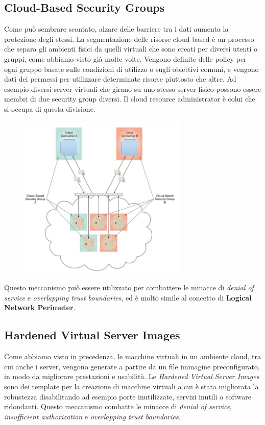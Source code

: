\subsection{Cloud-Based Security Groups}
Come può sembrare scontato, alzare delle barriere tra i dati aumenta la protezione degli stessi. La segmentazione delle risorse cloud-based è un processo che separa gli ambienti fisici da quelli virtuali che sono creati per diversi utenti o gruppi, come abbiamo visto già molte volte. Vengono definite delle policy per ogni gruppo basate sulle condizioni di utilizzo o sugli obiettivi comuni, e vengono dati dei permessi per utilizzare determinate risorse piuttosto che altre. Ad esempio diversi server virtuali che girano su uno stesso server fisico possono essere membri di due security group diversi. Il cloud resource administrator è colui che si occupa di questa divisione.

\begin{figure}[htb!]
    \centering
    \includegraphics[width=8cm]{./Images/cap10/10.5.png}
\end{figure}

Questo meccanismo può essere utilizzato per combattere le minacce di \textit{denial of service} e \textit{overlapping trust boundaries}, ed è molto simile al concetto di \textbf{Logical Network Perimeter}.


\subsection{Hardened Virtual Server Images}
Come abbiamo visto in precedenza, le macchine virtuali in un ambiente cloud, tra cui anche i server, vengono generate a partire da un file immagine preconfigurato, in modo da migliorare prestazioni e usabilità. Le \textit{Hardened Virtual Server Images} sono dei template per la creazione di macchine virtuali a cui è stata migliorata la robustezza disabilitando ad esempio porte inutilizzate, servizi inutili o software ridondanti. Questo meccanismo combatte le minacce di \textit{denial of service}, \textit{insufficient authorization} e \textit{overlapping trust boundaries}.



